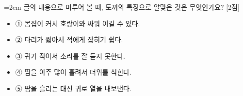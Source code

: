 \documentclass[12pt,a4paper]{article}
\newcommand{\qnum}[1]{%
  \tikz[baseline=(num.base)]{%
    \node[circle, fill=numCircle, text=white, inner sep=0pt,
          minimum size=18pt, font=\small\bfseries] (num) {#1};%
  }%
}
\newcommand{\pts}[1]{%
  \hfill\textcolor{ptsBadge}{[#1점]}%
}
\begin{document}
\vspace{4mm}
\begin{samepage}
{\hangindent=2em
\qnum{32}\enspace 글의 내용으로 미루어 볼 때, 토끼의 특징으로 알맞은 것은 무엇인가요? \pts{2}
\par}

\vspace{3mm}
\begin{itemize}[leftmargin=2.5em, labelsep=0.3em, label={}, itemsep=4pt, parsep=1pt, topsep=0pt]
  \item ① 몸집이 커서 호랑이와 싸워 이길 수 있다.
  \item ② 다리가 짧아서 적에게 잡히기 쉽다.
  \item ③ 귀가 작아서 소리를 잘 듣지 못한다.
  \item ④ 땀을 아주 많이 흘려서 더위를 식힌다.
  \item ⑤ 땀을 흘리는 대신 귀로 열을 내보낸다.
\end{itemize}
\end{samepage}
\end{document}
